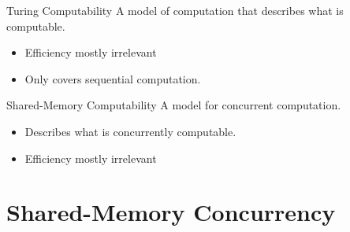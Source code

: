 \begin{tcbraster}[raster columns=2, raster equal height]
	\begin{definitionbox}{Turing Computability}
		A model of computation that describes what is computable.
		\begin{itemize}
			\item Efficiency mostly irrelevant
			\item Only covers sequential computation.
		\end{itemize}
	\end{definitionbox}
	\begin{definitionbox}{Shared-Memory Computability}
		A model for concurrent computation.
		\begin{itemize}
			\item Describes what is concurrently computable.
			\item Efficiency mostly irrelevant
		\end{itemize}
	\end{definitionbox}
\end{tcbraster}

\section{Shared-Memory Concurrency}
